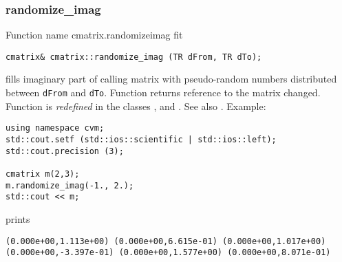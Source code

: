 \subsubsection{randomize\_imag}
Function%
\pdfdest name {cmatrix.randomizeimag} fit
\begin{verbatim}
cmatrix& cmatrix::randomize_imag (TR dFrom, TR dTo);
\end{verbatim}
fills  imaginary part of  calling matrix with 
pseudo-random numbers distributed between
\verb"dFrom" and \verb"dTo".
Function
returns  reference to the matrix changed.
Function is \emph{redefined} in the classes
,  and
.
See also
.
Example:
\begin{Verbatim}
using namespace cvm;
std::cout.setf (std::ios::scientific | std::ios::left); 
std::cout.precision (3);

cmatrix m(2,3);
m.randomize_imag(-1., 2.);
std::cout << m;
\end{Verbatim}
prints
\begin{Verbatim}
(0.000e+00,1.113e+00) (0.000e+00,6.615e-01) (0.000e+00,1.017e+00)
(0.000e+00,-3.397e-01) (0.000e+00,1.577e+00) (0.000e+00,8.071e-01)
\end{Verbatim}
\newpage

